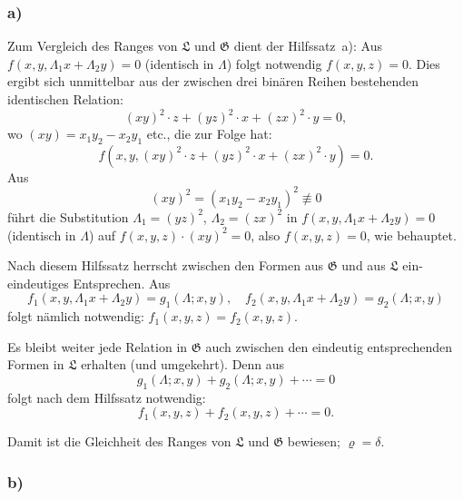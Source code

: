\documentclass[12pt,a4paper]{article}
\begin{document}
\subsubsection*{a)}

Zum Vergleich des Ranges von $\mathfrak{L}$ und $\mathfrak{G}$ dient der Hilfssatz~a): Aus $f(x, y, \Lambda_1 x + \Lambda_2 y) = 0$ (identisch in $\Lambda$) folgt notwendig $f(x, y, z) = 0$. Dies ergibt sich unmittelbar aus der zwischen drei bin\"aren Reihen bestehenden identischen Relation:
\[(xy)^2 \cdot z + (yz)^2 \cdot x + (zx)^2 \cdot y = 0,\]
wo $(xy) = x_1 y_2 - x_2 y_1$ etc., die zur Folge hat:
\[
f(x, y, (xy)^2 \cdot z + (yz)^2 \cdot x + (zx)^2 \cdot y) = 0.
\]
Aus
\[
(xy)^2 = (x_1 y_2 - x_2 y_1)^2 \not\equiv 0
\]
f\"uhrt die Substitution $\Lambda_1 = (yz)^2$, $\Lambda_2 = (zx)^2$ in $f(x, y, \Lambda_1 x + \Lambda_2 y) = 0$ (identisch in $\Lambda$) auf $f(x, y, z) \cdot (xy)^2 = 0$, also $f(x, y, z) = 0$, wie behauptet.

Nach diesem Hilfssatz herrscht zwischen den Formen aus $\mathfrak{G}$ und aus $\mathfrak{L}$ ein-eindeutiges Entsprechen. Aus
\[
f_1(x, y, \Lambda_1 x + \Lambda_2 y) = g_1(\Lambda; x, y), \quad f_2(x, y, \Lambda_1 x + \Lambda_2 y) = g_2(\Lambda; x, y)
\]
folgt n\"amlich notwendig: $f_1(x, y, z) = f_2(x, y, z)$.

Es bleibt weiter jede Relation in $\mathfrak{G}$ auch zwischen den eindeutig entsprechenden Formen in $\mathfrak{L}$ erhalten (und umgekehrt). Denn aus
\[g_1(\Lambda; x, y) + g_2(\Lambda; x, y) + \cdots = 0\]
folgt nach dem Hilfssatz notwendig:
\[f_1(x, y, z) + f_2(x, y, z) + \cdots = 0.\]

Damit ist die Gleichheit des Ranges von $\mathfrak{L}$ und $\mathfrak{G}$ bewiesen; $\varrho = \delta$.

\subsubsection*{b)}
\end{document}
